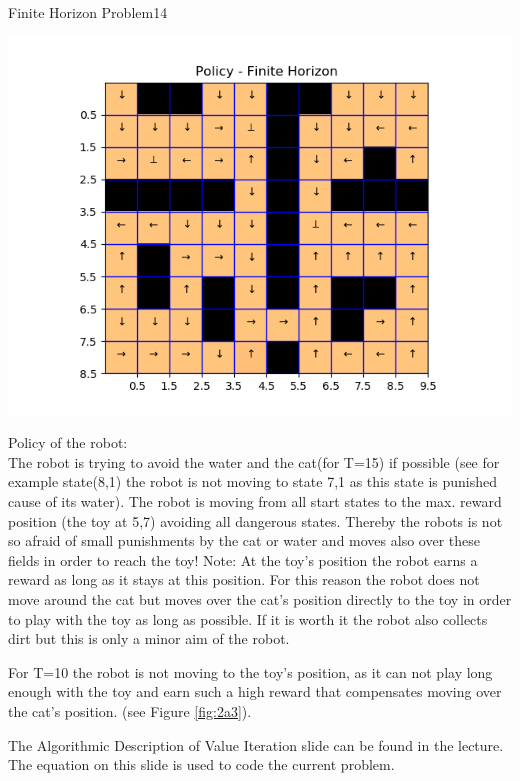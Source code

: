 \begin{questions}
\begin{question}{Finite Horizon Problem}{14}
\begin{answer}
\begin{minipage}{.5\textwidth}
	\includegraphics[width=1\textwidth]{img/2a_T10.png} 
	\label{fig:2a3}               
\end{minipage}

Policy of the robot:\\
The robot is trying to avoid the water and the cat(for T=15) if possible (see for example state(8,1) the robot is not moving to state 7,1 as this state is punished cause of its water). The robot is moving from all start states to the max. reward position (the toy at 5,7) avoiding all dangerous states. Thereby the robots is not so afraid of small punishments by the cat or water and moves also over these fields in order to reach the toy! Note: At the toy's position the robot earns a reward as long as it stays at this position. For this reason the robot does not move around the cat but moves over the cat's position directly to the toy in order to play with the toy as long as possible. If it is worth it the robot also collects dirt but this is only a minor aim of the robot.

For T=10 the robot is not moving to the toy's position, as it can not play long enough with the toy and earn such a high reward that compensates moving over the cat's position. (see Figure \ref{fig:2a3}).

The Algorithmic Description of Value Iteration slide can be found in the lecture. The equation on this slide is used to code the current problem.


\end{answer}


\end{question}
\end{questions}

